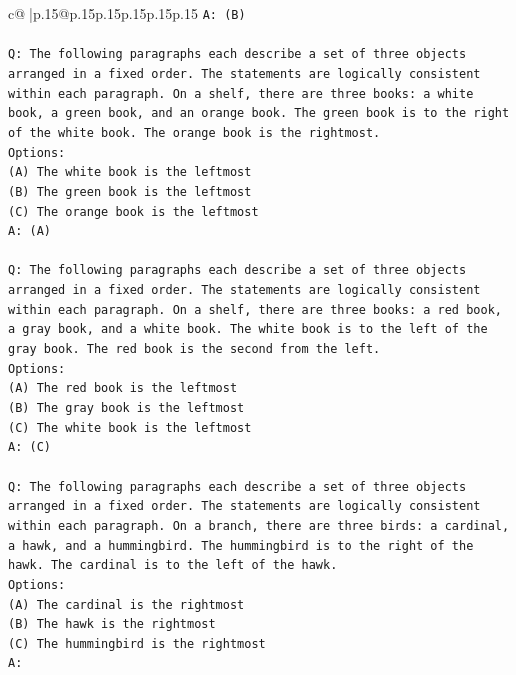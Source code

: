 \documentclass{article}
\begin{document}
{\begin{supertabular}{c@{$\;$}|p{.15\linewidth}@{}p{.15\linewidth}p{.15\linewidth}p{.15\linewidth}p{.15\linewidth}p{.15\linewidth}}
{{{\texttt{A: (B)} \\
\\ 
\texttt{Q: The following paragraphs each describe a set of three objects arranged in a fixed order. The statements are logically consistent within each paragraph. On a shelf, there are three books: a white book, a green book, and an orange book. The green book is to the right of the white book. The orange book is the rightmost.} \\
\texttt{Options:} \\
\texttt{(A) The white book is the leftmost} \\
\texttt{(B) The green book is the leftmost} \\
\texttt{(C) The orange book is the leftmost} \\
\texttt{A: (A)} \\
\\ 
\texttt{Q: The following paragraphs each describe a set of three objects arranged in a fixed order. The statements are logically consistent within each paragraph. On a shelf, there are three books: a red book, a gray book, and a white book. The white book is to the left of the gray book. The red book is the second from the left.} \\
\texttt{Options:} \\
\texttt{(A) The red book is the leftmost} \\
\texttt{(B) The gray book is the leftmost} \\
\texttt{(C) The white book is the leftmost} \\
\texttt{A: (C)} \\
\\ 
\texttt{Q: The following paragraphs each describe a set of three objects arranged in a fixed order. The statements are logically consistent within each paragraph. On a branch, there are three birds: a cardinal, a hawk, and a hummingbird. The hummingbird is to the right of the hawk. The cardinal is to the left of the hawk.} \\
\texttt{Options:} \\
\texttt{(A) The cardinal is the rightmost} \\
\texttt{(B) The hawk is the rightmost} \\
\texttt{(C) The hummingbird is the rightmost} \\
\texttt{A:} \\
            }
        }
    }
     \\ \\


\end{supertabular}}
\end{document}

